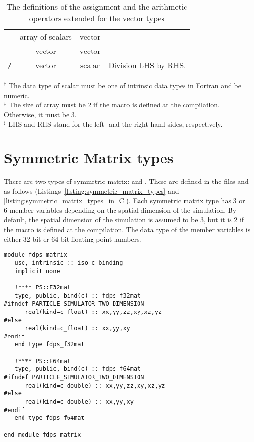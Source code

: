 \begin{table}[H]
\begin{tabularx}{\linewidth}{|c|c|c|X|}
\cmidrule(r){2-3}
 & array of scalars & vector &  \\
\cmidrule(r){2-3}
 & vector & vector &  \\
\midrule
\texttt{/} & vector & scalar & Division LHS by RHS. \\
\bottomrule
\end{tabularx}
\begin{flushleft}
$^{\dagger}$ The data type of scalar must be one of intrinsic data types in Fortran and be numeric. \\
$^{\ddagger}$ The size of array must be 2 if the macro  is defined at the compilation. Otherwise, it must be 3. \\
$^{\sharp}$ LHS and RHS stand for the left- and the right-hand sides, respectively.
\end{flushleft}
\caption{The definitions of the assignment and the arithmetic operators extended for the vector types}
\label{tbl:op_ext:fdps_vector}
\end{table}


\section{Symmetric Matrix types}
\label{sec:symmetric_matrix_types}
There are two types of symmetric matrix:  and . These are defined in the files  and  as follows (Listings~\ref{listing:symmetric_matrix_types} and \ref{listing:symmetric_matrix_types_in_C}). Each symmetric matrix type has 3 or 6 member variables depending on the spatial dimension of the simulation. By default, the spatial dimension of the simulation is assumed to be 3, but it is 2 if the macro  is defined at the compilation. The data type of the member variables is either 32-bit or 64-bit floating point numbers.

\begin{lstlisting}[caption=Symmetric Matrix types (Fortran),label=listing:symmetric_matrix_types]
module fdps_matrix
   use, intrinsic :: iso_c_binding
   implicit none

   !**** PS::F32mat
   type, public, bind(c) :: fdps_f32mat
#ifndef PARTICLE_SIMULATOR_TWO_DIMENSION
      real(kind=c_float) :: xx,yy,zz,xy,xz,yz
#else
      real(kind=c_float) :: xx,yy,xy
#endif
   end type fdps_f32mat

   !**** PS::F64mat
   type, public, bind(c) :: fdps_f64mat
#ifndef PARTICLE_SIMULATOR_TWO_DIMENSION
      real(kind=c_double) :: xx,yy,zz,xy,xz,yz
#else
      real(kind=c_double) :: xx,yy,xy
#endif
   end type fdps_f64mat

end module fdps_matrix  
\end{lstlisting}

